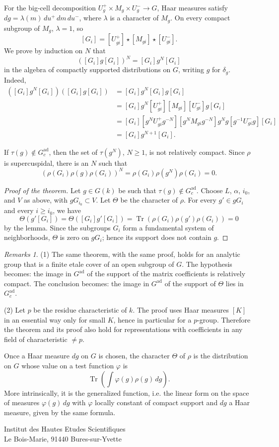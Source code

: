 \documentclass[11pt]{amsart}
\theoremstyle{plain}
\theoremstyle{definition}
\theoremstyle{remark}
\newtheorem*{remarks*}{Remarks}
\DeclareMathOperator{\Tr}{Tr}
\begin{document}
For the big-cell decomposition $U_g^+\times M_g\times U_g^-\to G$, Haar measures satisfy $dg=\lambda(m)\,du^+\,dm\,du^-$, where $\lambda$ is a character of $M_g$. On every compact subgroup of $M_g$, $\lambda=1$, so
\[
[G_i]=[U_{gi}^+]\star[M_{gi}]\star[U_{gi}^-].
\]
We prove by induction on $N$ that
\[
([G_i]g[G_i])^N=[G_i]g^N[G_i]
\]
in the algebra of compactly supported distributions on $G$, writing $g$ for $\delta_g$. Indeed,
\begin{align*}
([G_i]g^N[G_i])([G_i]g[G_i])
&=[G_i]g^N[G_i]g[G_i]\\
&=[G_i]g^N[U_{gi}^+][M_{gi}][U_{gi}^-]g[G_i]\\
&=[G_i][g^NU_{gi}^+g^{-N}][g^NM_{gi}g^{-N}]g^Ng[g^{-1}U_{gi}^-g][G_i]\\
&=[G_i]g^{N+1}[G_i].
\end{align*}

If $\tau(g)\notin G_c^{\mathrm{ad}}$, then the set of $\tau(g^N)$, $N\ge1$, is not relatively compact. Since $\rho$ is supercuspidal, there is an $N$ such that
\[
(\rho(G_i)\rho(g)\rho(G_i))^N=\rho(G_i)\rho(g^N)\rho(G_i)=0.
\]

\begin{proof}[Proof of the theorem]
Let $g\in G(k)$ be such that $\tau(g)\notin G_c^{\mathrm{ad}}$. Choose $L$, $\alpha$, $i_0$, and $V$ as above, with $gG_{i_0}\subset V$. Let $\Theta$ be the character of $\rho$. For every $g'\in gG_i$ and every $i\ge i_0$, we have
\[
\Theta(g'[G_i])=\Theta([G_i]g'[G_i])=\Tr(\rho(G_i)\rho(g')\rho(G_i))=0
\]
by the lemma. Since the subgroups $G_i$ form a fundamental system of neighborhoods, $\Theta$ is zero on $gG_i$; hence its support does not contain $g$.
\end{proof}

\begin{remarks*}
(1) The same theorem, with the same proof, holds for an analytic group that is a finite etale cover of an open subgroup of $G$. The hypothesis becomes: the image in $G^{\mathrm{ad}}$ of the support of the matrix coefficients is relatively compact. The conclusion becomes: the image in $G^{\mathrm{ad}}$ of the support of $\Theta$ lies in $G_c^{\mathrm{ad}}$.

(2) Let $p$ be the residue characteristic of $k$. The proof uses Haar measures $[K]$ in an essential way only for small $K$, hence in particular for a $p$-group. Therefore the theorem and its proof also hold for representations with coefficients in any field of characteristic $\ne p$.
\end{remarks*}

Once a Haar measure $dg$ on $G$ is chosen, the character $\Theta$ of $\rho$ is the distribution on $G$ whose value on a test function $\varphi$ is
\[
\Tr\left(\int\varphi(g)\rho(g)\,dg\right).
\]
More intrinsically, it is the generalized function, i.e. the linear form on the space of measures $\varphi(g)\,dg$ with $\varphi$ locally constant of compact support and $dg$ a Haar measure, given by the same formula.

\begin{flushright}
Institut des Hautes Etudes Scientifiques\\
Le Bois-Marie, 91440 Bures-sur-Yvette
\end{flushright}
\end{document}
